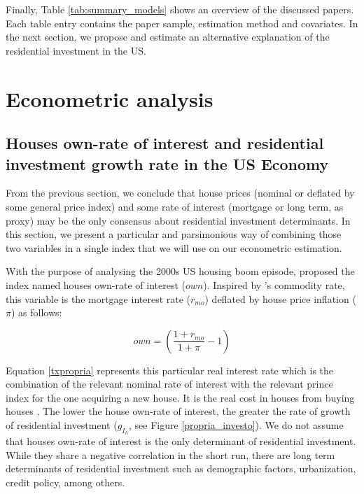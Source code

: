 \documentclass[12pt, a4paper]{article}
\begin{document}
Finally, Table \ref{tab:summary_models} shows an overview of the discussed papers.
Each table entry contains the paper sample, estimation method and covariates.
In the next section, we propose and estimate an alternative explanation of the residential investment in the US.




\section{Econometric analysis}
\label{sec:org2f1f39b}
\label{sec:VECM}
\subsection{Houses own-rate of interest and residential investment growth rate in the US Economy}
\label{sec:orga341e04}
\label{sec:own}

From the previous section, we conclude that house prices (nominal or deflated by some general price index) and some rate of interest (mortgage or long term, as proxy) may be the only consensus about residential investment determinants.
In this section, we present a particular and parsimonious way of combining those two variables  in a single index that we will use on our econometric estimation.


With the purpose of analysing the 2000s US housing boom episode, \textcite{teixeira_crescimento_2015}  proposed the index named houses own-rate of interest (\(own\)).
Inspired by \citeauthor*{sraffaDrHayekMoney1932}'s \citeyear{sraffaDrHayekMoney1932} commodity rate, this variable is the mortgage interest rate (\(r_{mo}\)) deflated by house price inflation (\(\pi\)) as follows:
\begin{latex}
\begin{equation}
\label{txpropria}
own =  \left(\frac{1+r_{mo}}{1+\pi} - 1\right)
\end{equation}
\end{latex}
Equation \ref{txpropria} represents this particular real interest rate which is the combination of the relevant nominal rate of interest with the relevant prince index for the one acquiring a new house.
It is the real cost in houses from buying houses  \cite[p.~53]{teixeira_crescimento_2015}.
The lower the house own-rate of interest, the greater the rate of growth of residential investment (\(g_{I_{h}}\), see Figure \ref{propria_investo}).
We do not assume that houses own-rate of interest is the only determinant of residential investment.
While they share a negative correlation in the short run, there are long term determinants of residential investment such as demographic factors, urbanization, credit policy, among others.
\end{document}
